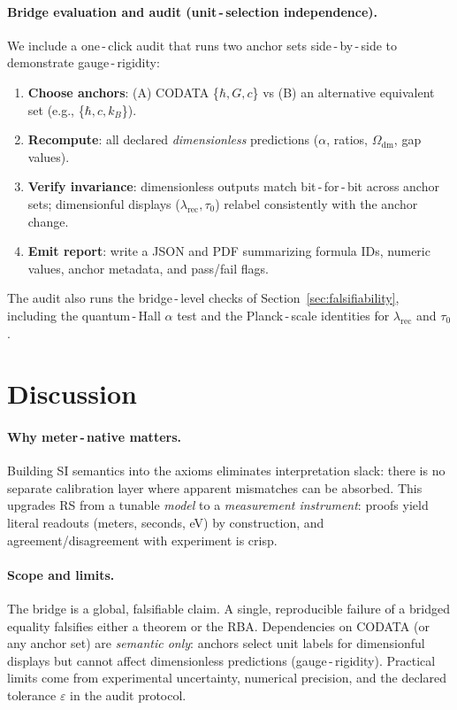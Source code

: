 \documentclass[11pt]{article}
\newcommand{\lamrec}{\lambda_{\mathrm{rec}}}
\newcommand{\tauzero}{\tau_{0}}
\theoremstyle{remark}
\begin{document}
\paragraph{Bridge evaluation and audit (unit\,\mbox{-}\,selection independence).}
We include a one\,\mbox{-}\,click audit that runs two anchor sets side\,\mbox{-}\,by\,\mbox{-}\,side to demonstrate gauge\,\mbox{-}\,rigidity:
\begin{enumerate}
  \item \textbf{Choose anchors}: \;(A) CODATA\,\,\{$\hbar, G, c$\} vs (B) an alternative equivalent set (e.g., \{$\hbar, c, k_{B}$\}).
  \item \textbf{Recompute}: \;all declared \emph{dimensionless} predictions ($\alpha$, ratios, $\Omega_{\mathrm{dm}}$, gap values).
  \item \textbf{Verify invariance}: \;dimensionless outputs match bit\,\mbox{-}\,for\,\mbox{-}\,bit across anchor sets; dimensionful displays (\(\lamrec, \tauzero\)) relabel consistently with the anchor change.
  \item \textbf{Emit report}: \;write a JSON and PDF summarizing formula IDs, numeric values, anchor metadata, and pass/fail flags.
\end{enumerate}
The audit also runs the bridge\,\mbox{-}\,level checks of Section~\ref{sec:falsifiability}, including the quantum\,\mbox{-}\,Hall $\alpha$ test and the Planck\,\mbox{-}\,scale identities for $\lamrec$ and $\tauzero$.

\section{Discussion}
\paragraph{Why meter\,\mbox{-}\,native matters.}
Building SI semantics into the axioms eliminates interpretation slack: there is no separate calibration layer where apparent mismatches can be absorbed. This upgrades RS from a tunable \emph{model} to a \emph{measurement instrument}: proofs yield literal readouts (meters, seconds, eV) by construction, and agreement/disagreement with experiment is crisp.

\paragraph{Scope and limits.}
The bridge is a global, falsifiable claim. A single, reproducible failure of a bridged equality falsifies either a theorem or the RBA. Dependencies on CODATA (or any anchor set) are \emph{semantic only}: anchors select unit labels for dimensionful displays but cannot affect dimensionless predictions (gauge\,\mbox{-}\,rigidity). Practical limits come from experimental uncertainty, numerical precision, and the declared tolerance $\varepsilon$ in the audit protocol.
\end{document}
